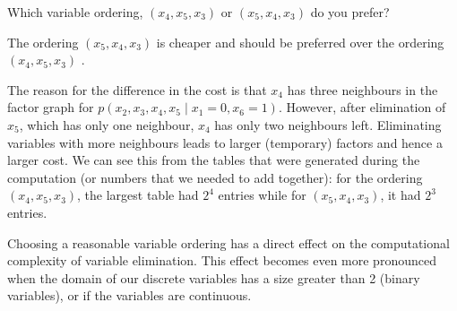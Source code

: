 \begin{exenumerate}
\begin{solution}
  \end{solution}

\item Which variable ordering, $(x_4, x_5, x_3)$ or $(x_5, x_4, x_3)$ do you prefer?

  \begin{solution}
    The ordering $(x_5, x_4, x_3)$ is cheaper and should be preferred
    over the ordering $(x_4, x_5, x_3)$ .

    The reason for the difference in the cost is that $x_4$ has three
    neighbours in the factor graph for $p(x_2, x_3, x_4, x_5 \mid
    x_1=0, x_6=1)$. However, after elimination of $x_5$, which has
    only one neighbour, $x_4$ has only two neighbours
    left. Eliminating variables with more neighbours leads to
    larger (temporary) factors and hence a larger cost. We can see
    this from the tables that were generated during the computation
    (or numbers that we needed to add together): for the ordering
    $(x_4, x_5, x_3)$, the largest table had $2^4$ entries while for
    $(x_5, x_4, x_3)$, it had $2^3$ entries.

    Choosing a reasonable variable ordering has a direct effect on the
    computational complexity of variable elimination. This effect
    becomes even more pronounced when the domain of our discrete
    variables has a size greater than 2 (binary variables), or if the
    variables are continuous.
    
    \begin{center}
    \end{center}

    

  \end{solution}
  
\end{exenumerate}

